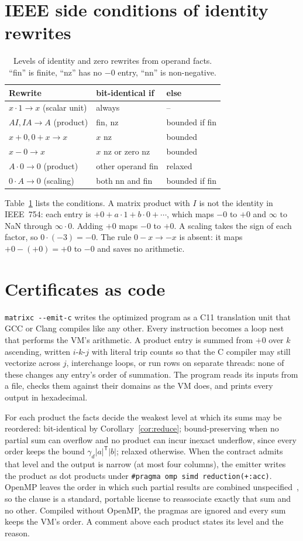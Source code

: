 \documentclass[acmsmall,review,anonymous,nonacm]{acmart}
\newcommand{\abs}[1]{\lvert #1\rvert}
\begin{document}
\section{IEEE side conditions of identity rewrites}
\begin{table}[t]
\caption{Levels of identity and zero rewrites from operand facts. ``fin'' is
finite, ``nz'' has no $-0$ entry, ``nn'' is non-negative.}\label{tab:side}
\footnotesize
\begin{tabular}{lll}
\toprule
Rewrite & bit-identical if & else\\
\midrule
$x\cdot1\to x$ (scalar unit) & always & --\\
$AI, IA\to A$ (product) & fin, nz & bounded if fin\\
$x+0, 0+x\to x$ & $x$ nz & bounded\\
$x-0\to x$ & $x$ nz or zero nz & bounded\\
$A\cdot0\to0$ (product) & other operand fin & relaxed\\
$0\cdot A\to0$ (scaling) & both nn and fin & bounded if fin\\
\bottomrule
\end{tabular}
\end{table}
Table~\ref{tab:side} lists the conditions. A matrix product with $I$ is not the
identity in IEEE~754: each entry is $+0+a\cdot1+b\cdot0+\cdots$, which maps
$-0$ to $+0$ and $\infty$ to NaN through $\infty\cdot0$. Adding $+0$ maps $-0$
to $+0$. A scaling takes the sign of each factor, so $0\cdot(-3)=-0$. The rule
$0-x\to-x$ is absent: it maps $+0-(+0)=+0$ to $-0$ and saves no arithmetic.

\section{Certificates as code}\label{sec:codegen}
\texttt{matrixc -{}-emit-c} writes the optimized program as a C11 translation
unit that GCC or Clang compiles like any other. Every instruction becomes a loop
nest that performs the VM's arithmetic. A product entry is summed from $+0$ over
$k$ ascending, written $i$-$k$-$j$ with literal trip counts so that the C
compiler may still vectorize across $j$, interchange loops, or run rows on
separate threads: none of these changes any entry's order of summation. The
program reads its inputs from a file, checks them against their domains as the
VM does, and prints every output in hexadecimal.

For each product the facts decide the weakest level at which its sums may be
reordered: bit-identical by Corollary~\ref{cor:reduce}; bound-preserving when no
partial sum can overflow and no product can incur inexact underflow,
since every order keeps the bound $\gamma_d\abs{a}^{\mathsf T}\abs{b}$;
relaxed otherwise. When the contract admits that level and the output is narrow
(at most four columns), the emitter writes the product as dot products under
\texttt{\#pragma omp simd reduction(+:acc)}. OpenMP leaves the order in which
such partial results are combined unspecified~\cite{openmp}, so the clause is a
standard, portable license to reassociate exactly that sum and no other.
Compiled without OpenMP, the pragmas are ignored and every sum keeps the VM's
order. A comment above each product states its level and the reason.
\end{document}
